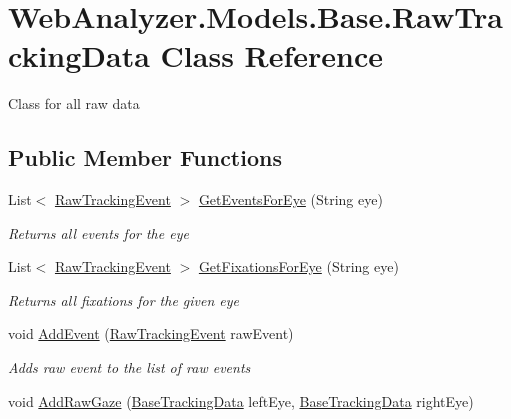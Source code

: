 \hypertarget{class_web_analyzer_1_1_models_1_1_base_1_1_raw_tracking_data}{}\section{Web\+Analyzer.\+Models.\+Base.\+Raw\+Tracking\+Data Class Reference}
\label{class_web_analyzer_1_1_models_1_1_base_1_1_raw_tracking_data}


Class for all raw data  


\subsection*{Public Member Functions}
\begin{DoxyCompactItemize}
\item 
List$<$ \hyperlink{class_web_analyzer_1_1_models_1_1_base_1_1_raw_tracking_event}{Raw\+Tracking\+Event} $>$ \hyperlink{class_web_analyzer_1_1_models_1_1_base_1_1_raw_tracking_data_a7b99eb9ecc19bc3dc012deecb687dc70}{Get\+Events\+For\+Eye} (String eye)
\begin{DoxyCompactList}\small\item\em Returns all events for the eye \end{DoxyCompactList}\item 
List$<$ \hyperlink{class_web_analyzer_1_1_models_1_1_base_1_1_raw_tracking_event}{Raw\+Tracking\+Event} $>$ \hyperlink{class_web_analyzer_1_1_models_1_1_base_1_1_raw_tracking_data_ab3a2654d87bb9a265b4f58ee3eddc7a5}{Get\+Fixations\+For\+Eye} (String eye)
\begin{DoxyCompactList}\small\item\em Returns all fixations for the given eye \end{DoxyCompactList}\item 
void \hyperlink{class_web_analyzer_1_1_models_1_1_base_1_1_raw_tracking_data_ab923bf3a6c112dacfbfe7b81cd45cc17}{Add\+Event} (\hyperlink{class_web_analyzer_1_1_models_1_1_base_1_1_raw_tracking_event}{Raw\+Tracking\+Event} raw\+Event)
\begin{DoxyCompactList}\small\item\em Adds raw event to the list of raw events \end{DoxyCompactList}\item 
void \hyperlink{class_web_analyzer_1_1_models_1_1_base_1_1_raw_tracking_data_ad49451f7a582a47999c85666dd4ed879}{Add\+Raw\+Gaze} (\hyperlink{class_web_analyzer_1_1_models_1_1_base_1_1_base_tracking_data}{Base\+Tracking\+Data} left\+Eye, \hyperlink{class_web_analyzer_1_1_models_1_1_base_1_1_base_tracking_data}{Base\+Tracking\+Data} right\+Eye)

\end{DoxyCompactItemize}
